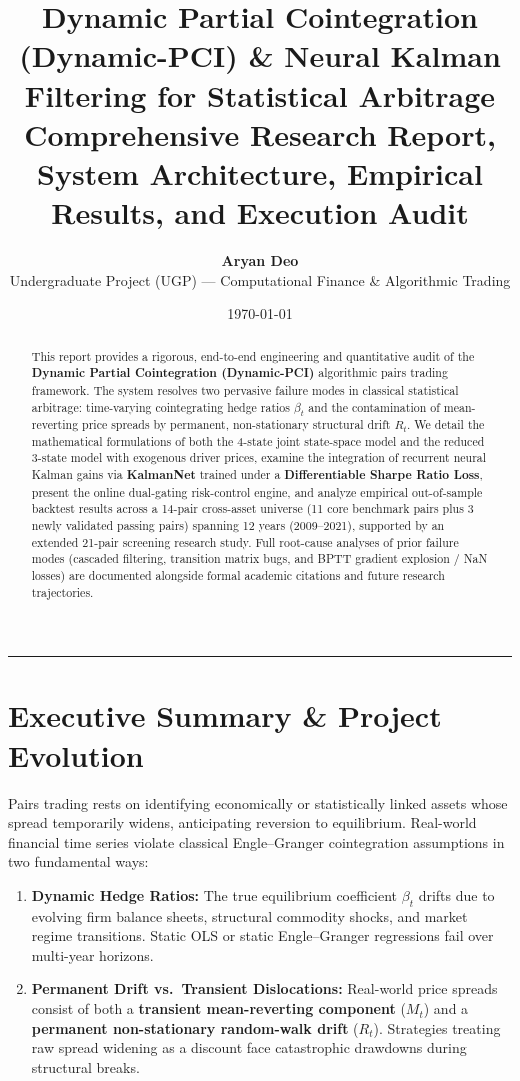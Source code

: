 \documentclass[11pt, a4paper]{article}
\title{\textbf{\Large Dynamic Partial Cointegration (Dynamic-PCI) \& Neural Kalman Filtering for Statistical Arbitrage}\\[0.4em]
\large Comprehensive Research Report, System Architecture, Empirical Results, and Execution Audit}
\author{\textbf{Aryan Deo}\\
\small Undergraduate Project (UGP) --- Computational Finance \& Algorithmic Trading}
\date{\today}
\begin{document}
\maketitle

\begin{abstract}
This report provides a rigorous, end-to-end engineering and quantitative audit of the \textbf{Dynamic Partial Cointegration (Dynamic-PCI)} algorithmic pairs trading framework. The system resolves two pervasive failure modes in classical statistical arbitrage: time-varying cointegrating hedge ratios $\beta_t$ and the contamination of mean-reverting price spreads by permanent, non-stationary structural drift $R_t$. We detail the mathematical formulations of both the 4-state joint state-space model and the reduced 3-state model with exogenous driver prices, examine the integration of recurrent neural Kalman gains via \textbf{KalmanNet} trained under a \textbf{Differentiable Sharpe Ratio Loss}, present the online dual-gating risk-control engine, and analyze empirical out-of-sample backtest results across a 14-pair cross-asset universe (11 core benchmark pairs plus 3 newly validated passing pairs) spanning 12 years (2009--2021), supported by an extended 21-pair screening research study. Full root-cause analyses of prior failure modes (cascaded filtering, transition matrix bugs, and BPTT gradient explosion / NaN losses) are documented alongside formal academic citations and future research trajectories.
\end{abstract}

\tableofcontents
\vspace{1.5em}
\hrule
\vspace{1.5em}

\section{Executive Summary \& Project Evolution}

Pairs trading rests on identifying economically or statistically linked assets whose spread temporarily widens, anticipating reversion to equilibrium. Real-world financial time series violate classical Engle--Granger cointegration assumptions in two fundamental ways:
\begin{enumerate}
    \item \textbf{Dynamic Hedge Ratios:} The true equilibrium coefficient $\beta_t$ drifts due to evolving firm balance sheets, structural commodity shocks, and market regime transitions. Static OLS or static Engle--Granger regressions fail over multi-year horizons.
    \item \textbf{Permanent Drift vs.\ Transient Dislocations:} Real-world price spreads consist of both a \textbf{transient mean-reverting component} ($M_t$) and a \textbf{permanent non-stationary random-walk drift} ($R_t$). Strategies treating raw spread widening as a discount face catastrophic drawdowns during structural breaks.
\end{enumerate}
\end{document}
